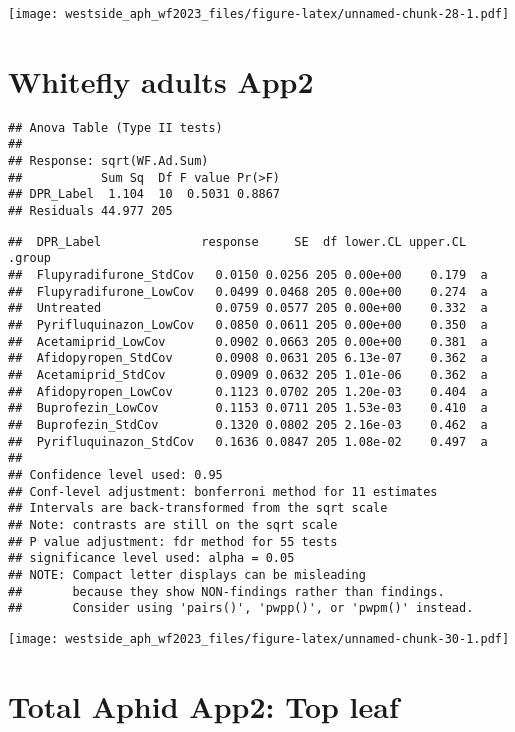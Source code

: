 \documentclass[
]{article}
\begin{document}
\texttt{[image: westside\_aph\_wf2023\_files/figure-latex/unnamed-chunk-28-1.pdf]}

\hypertarget{whitefly-adults-app2}{%
\section{Whitefly adults App2}\label{whitefly-adults-app2}}

\begin{verbatim}
## Anova Table (Type II tests)
## 
## Response: sqrt(WF.Ad.Sum)
##           Sum Sq  Df F value Pr(>F)
## DPR_Label  1.104  10  0.5031 0.8867
## Residuals 44.977 205
\end{verbatim}

\begin{verbatim}
##  DPR_Label              response     SE  df lower.CL upper.CL .group
##  Flupyradifurone_StdCov   0.0150 0.0256 205 0.00e+00    0.179  a    
##  Flupyradifurone_LowCov   0.0499 0.0468 205 0.00e+00    0.274  a    
##  Untreated                0.0759 0.0577 205 0.00e+00    0.332  a    
##  Pyrifluquinazon_LowCov   0.0850 0.0611 205 0.00e+00    0.350  a    
##  Acetamiprid_LowCov       0.0902 0.0663 205 0.00e+00    0.381  a    
##  Afidopyropen_StdCov      0.0908 0.0631 205 6.13e-07    0.362  a    
##  Acetamiprid_StdCov       0.0909 0.0632 205 1.01e-06    0.362  a    
##  Afidopyropen_LowCov      0.1123 0.0702 205 1.20e-03    0.404  a    
##  Buprofezin_LowCov        0.1153 0.0711 205 1.53e-03    0.410  a    
##  Buprofezin_StdCov        0.1320 0.0802 205 2.16e-03    0.462  a    
##  Pyrifluquinazon_StdCov   0.1636 0.0847 205 1.08e-02    0.497  a    
## 
## Confidence level used: 0.95 
## Conf-level adjustment: bonferroni method for 11 estimates 
## Intervals are back-transformed from the sqrt scale 
## Note: contrasts are still on the sqrt scale 
## P value adjustment: fdr method for 55 tests 
## significance level used: alpha = 0.05 
## NOTE: Compact letter displays can be misleading
##       because they show NON-findings rather than findings.
##       Consider using 'pairs()', 'pwpp()', or 'pwpm()' instead.
\end{verbatim}

\texttt{[image: westside\_aph\_wf2023\_files/figure-latex/unnamed-chunk-30-1.pdf]}

\hypertarget{total-aphid-app2-top-leaf}{%
\section{Total Aphid App2: Top leaf}\label{total-aphid-app2-top-leaf}}
\end{document}
